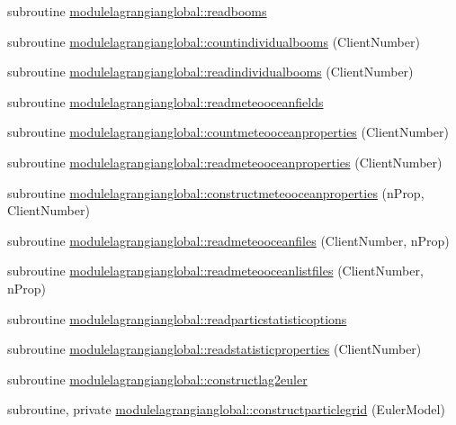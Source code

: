 \begin{DoxyCompactItemize}
\item 
subroutine \mbox{\hyperlink{namespacemodulelagrangianglobal_ae6c369ad79b4c62328e4792cd7aed791}{modulelagrangianglobal\+::readbooms}}
\item 
subroutine \mbox{\hyperlink{namespacemodulelagrangianglobal_ac2d819c6cb2d9890063752019007589c}{modulelagrangianglobal\+::countindividualbooms}} (Client\+Number)
\item 
subroutine \mbox{\hyperlink{namespacemodulelagrangianglobal_ac534055f33c12be80f6b5d331e9cca95}{modulelagrangianglobal\+::readindividualbooms}} (Client\+Number)
\item 
subroutine \mbox{\hyperlink{namespacemodulelagrangianglobal_ab2f7aa5d633698c89eab11bcf4c90928}{modulelagrangianglobal\+::readmeteooceanfields}}
\item 
subroutine \mbox{\hyperlink{namespacemodulelagrangianglobal_ab33bc04ab555b763cd51fa4dac937ccc}{modulelagrangianglobal\+::countmeteooceanproperties}} (Client\+Number)
\item 
subroutine \mbox{\hyperlink{namespacemodulelagrangianglobal_ae1973e5270fe0bd8fe935fa360c35bd1}{modulelagrangianglobal\+::readmeteooceanproperties}} (Client\+Number)
\item 
subroutine \mbox{\hyperlink{namespacemodulelagrangianglobal_afb3b7fc4fe38ef436cb911bb192358f1}{modulelagrangianglobal\+::constructmeteooceanproperties}} (n\+Prop, Client\+Number)
\item 
subroutine \mbox{\hyperlink{namespacemodulelagrangianglobal_aa7411b9f44061b325d38671fe7aefded}{modulelagrangianglobal\+::readmeteooceanfiles}} (Client\+Number, n\+Prop)
\item 
subroutine \mbox{\hyperlink{namespacemodulelagrangianglobal_ae46ac0f2e57613d902f2c85755570a82}{modulelagrangianglobal\+::readmeteooceanlistfiles}} (Client\+Number, n\+Prop)
\item 
subroutine \mbox{\hyperlink{namespacemodulelagrangianglobal_a8e12f5629f87247807ce50e9527b9fdd}{modulelagrangianglobal\+::readparticstatisticoptions}}
\item 
subroutine \mbox{\hyperlink{namespacemodulelagrangianglobal_aead4b53bdd55ea198839d3d5eda5c768}{modulelagrangianglobal\+::readstatisticproperties}} (Client\+Number)
\item 
subroutine \mbox{\hyperlink{namespacemodulelagrangianglobal_a5c09d9f8068efed26002854c2ba12362}{modulelagrangianglobal\+::constructlag2euler}}
\item 
subroutine, private \mbox{\hyperlink{namespacemodulelagrangianglobal_aad6524644ca62cde451d62e0964fe5de}{modulelagrangianglobal\+::constructparticlegrid}} (Euler\+Model)

\end{DoxyCompactItemize}
